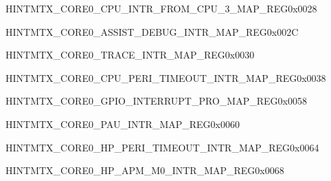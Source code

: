 \begin{register}{H}{INTMTX\_CORE0\_CPU\_INTR\_FROM\_CPU\_3\_MAP\_REG}{0x0028}\label{regdesc:INTMTXCORE0CPUINTRFROMCPU3MAPREG}
\end{register}\vspace{-3em}


\begin{register}{H}{INTMTX\_CORE0\_ASSIST\_DEBUG\_INTR\_MAP\_REG}{0x002C}\label{regdesc:INTMTXCORE0ASSISTDEBUGINTRMAPREG}
\end{register}\vspace{-3em}


\begin{register}{H}{INTMTX\_CORE0\_TRACE\_INTR\_MAP\_REG}{0x0030}\label{regdesc:INTMTXCORE0TRACEINTRMAPREG}
\end{register}\vspace{-3em}




\begin{register}{H}{INTMTX\_CORE0\_CPU\_PERI\_TIMEOUT\_INTR\_MAP\_REG}{0x0038}\label{regdesc:INTMTXCORE0CPUPERITIMEOUTINTRMAPREG}
\end{register}\vspace{-3em}



\begin{register}{H}{INTMTX\_CORE0\_GPIO\_INTERRUPT\_PRO\_MAP\_REG}{0x0058}\label{regdesc:INTMTXCORE0GPIOINTERRUPTPROMAPREG}
\end{register}\vspace{-3em}




\begin{register}{H}{INTMTX\_CORE0\_PAU\_INTR\_MAP\_REG}{0x0060}\label{regdesc:INTMTXCORE0PAUINTRMAPREG}
\end{register}\vspace{-3em}


\begin{register}{H}{INTMTX\_CORE0\_HP\_PERI\_TIMEOUT\_INTR\_MAP\_REG}{0x0064}\label{regdesc:INTMTXCORE0HPPERITIMEOUTINTRMAPREG}
\end{register}\vspace{-3em}


\begin{register}{H}{INTMTX\_CORE0\_HP\_APM\_M0\_INTR\_MAP\_REG}{0x0068}\label{regdesc:INTMTXCORE0HPAPMM0INTRMAPREG}
\end{register}\vspace{-3em}



